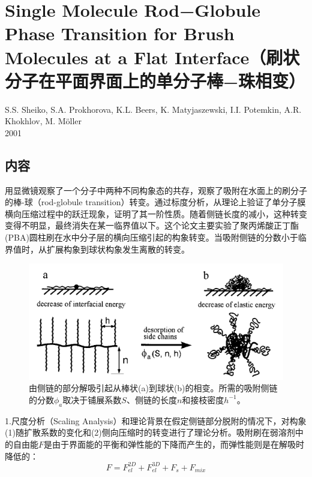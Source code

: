 \documentclass[12pt,a4paper]{article}
\title{}
\author{}
\date{\chntoday}
\numberwithin{equation}{section}
\begin{document}
\maketitle




\section{Single Molecule Rod−Globule Phase Transition for Brush Molecules at a Flat Interface（刷状分子在平面界面上的单分子棒−珠相变）}
\begin{center}
S.S. Sheiko, S.A. Prokhorova, K.L. Beers, K. Matyjaszewski, I.I. Potemkin, A.R. Khokhlov, M. Möller\\
2001
\end{center}
\subsection{内容}
用显微镜观察了一个分子中两种不同构象态的共存，观察了吸附在水面上的刷分子的棒-球（rod-globule transition）转变。通过标度分析，从理论上验证了单分子膜横向压缩过程中的跃迁现象，证明了其一阶性质。随着侧链长度的减小，这种转变变得不明显，最终消失在某一临界值以下。这个论文主要实验了聚丙烯酸正丁酯(PBA)圆柱刷在水中分子层的横向压缩引起的构象转变。当吸附侧链的分数小于临界值时，从扩展构象到球状构象发生离散的转变。
\begin{figure}[H]
\centering
\includegraphics[scale=0.5]{./figures/1.png}
\caption{由侧链的部分解吸引起从棒状(a)到球状(b)的相变。所需的吸附侧链的分数$\phi _{a}$取决于铺展系数$S$、侧链的长度$n$和接枝密度$h^{-1}$。}
\end{figure}
1.尺度分析（Scaling Analysis）和理论背景在假定侧链部分脱附的情况下，对构象(1)随扩散系数的变化和(2)侧向压缩时的转变进行了理论分析。吸附刷在弱溶剂中的自由能$F$是由于界面能的平衡和弹性能的下降而产生的，而弹性能则是在解吸时降低的：
\begin{equation}
F=F_{el}^{2D}+F_{el}^{3D}+F_s+F_{mix}
\end{equation}
\end{document}
